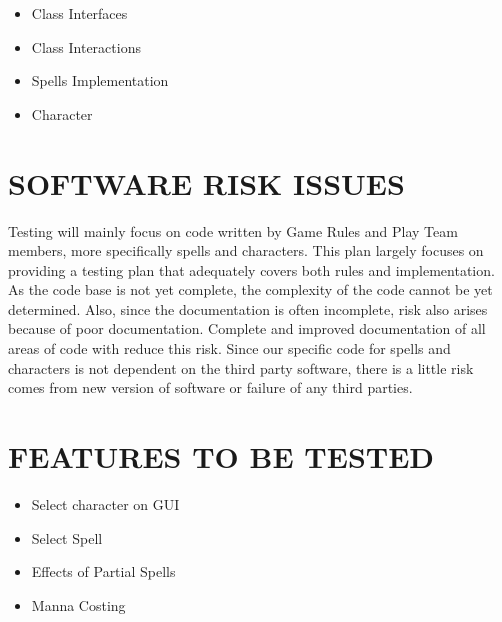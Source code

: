 {\color{black}
\begin{itemize}
\item Class Interfaces
\item Class Interactions
\item Spells Implementation
\item Character 
\end{itemize}
}

\section[SOFTWARE RISK ISSUES]{\bfseries\color{black} SOFTWARE RISK ISSUES}
{\color{black}

Testing will mainly focus on code written by Game Rules and Play Team members, more specifically spells and characters. This plan largely focuses on providing a testing plan that adequately covers both rules and implementation.
As the code base is not yet complete, the complexity of the code cannot be yet determined. Also, since the documentation is often incomplete, risk also arises because of poor documentation. Complete and improved documentation of all areas of code with reduce this risk. Since our specific code for spells and characters is not dependent on the third party software, there is a little risk comes from new version of software or failure of any third parties. 

}

\section[FEATURES TO BE TESTED]{\bfseries\color{black} FEATURES TO BE TESTED}
{\color{black}

\begin{itemize}
\item Select character on GUI
\item Select Spell
\item Effects of Partial Spells
\item Manna Costing
\end{itemize}

}

